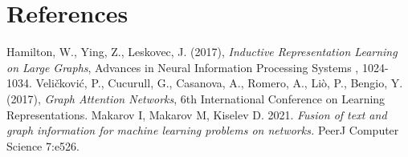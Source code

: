 \documentclass[a4paper,14pt]{article}
\begin{document}
\newpage
\section*{References}
\begin{thebibliography}{9}
Hamilton, W., Ying, Z., Leskovec, J. (2017), \emph{Inductive Representation Learning on Large Graphs}, Advances in Neural Information Processing Systems , 1024-1034.
Veličković, P., Cucurull, G., Casanova, A., Romero, A., Liò, P., Bengio, Y. (2017), \emph{Graph Attention Networks}, 6th International Conference on Learning Representations.
Makarov I, Makarov M, Kiselev D. 2021. \emph{Fusion of text and graph information for machine learning problems on networks.} PeerJ Computer Science 7:e526.
\end{thebibliography}
\end{document}
